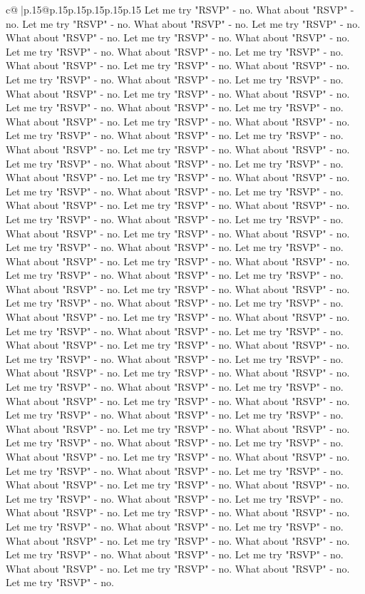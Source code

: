 \documentclass{article}
\begin{document}
{\begin{supertabular}{c@{$\;$}|p{.15\linewidth}@{}p{.15\linewidth}p{.15\linewidth}p{.15\linewidth}p{.15\linewidth}p{.15\linewidth}}
{{{Let me try "RSVP" {-} no. What about "RSVP" {-} no. Let me try "RSVP" {-} no. What about "RSVP" {-} no. Let me try "RSVP" {-} no. What about "RSVP" {-} no. Let me try "RSVP" {-} no. What about "RSVP" {-} no. Let me try "RSVP" {-} no. What about "RSVP" {-} no. Let me try "RSVP" {-} no. What about "RSVP" {-} no. Let me try "RSVP" {-} no. What about "RSVP" {-} no. Let me try "RSVP" {-} no. What about "RSVP" {-} no. Let me try "RSVP" {-} no. What about "RSVP" {-} no. Let me try "RSVP" {-} no. What about "RSVP" {-} no. Let me try "RSVP" {-} no. What about "RSVP" {-} no. Let me try "RSVP" {-} no. What about "RSVP" {-} no. Let me try "RSVP" {-} no. What about "RSVP" {-} no. Let me try "RSVP" {-} no. What about "RSVP" {-} no. Let me try "RSVP" {-} no. What about "RSVP" {-} no. Let me try "RSVP" {-} no. What about "RSVP" {-} no. Let me try "RSVP" {-} no. What about "RSVP" {-} no. Let me try "RSVP" {-} no. What about "RSVP" {-} no. Let me try "RSVP" {-} no. What about "RSVP" {-} no. Let me try "RSVP" {-} no. What about "RSVP" {-} no. Let me try "RSVP" {-} no. What about "RSVP" {-} no. Let me try "RSVP" {-} no. What about "RSVP" {-} no. Let me try "RSVP" {-} no. What about "RSVP" {-} no. Let me try "RSVP" {-} no. What about "RSVP" {-} no. Let me try "RSVP" {-} no. What about "RSVP" {-} no. Let me try "RSVP" {-} no. What about "RSVP" {-} no. Let me try "RSVP" {-} no. What about "RSVP" {-} no. Let me try "RSVP" {-} no. What about "RSVP" {-} no. Let me try "RSVP" {-} no. What about "RSVP" {-} no. Let me try "RSVP" {-} no. What about "RSVP" {-} no. Let me try "RSVP" {-} no. What about "RSVP" {-} no. Let me try "RSVP" {-} no. What about "RSVP" {-} no. Let me try "RSVP" {-} no. What about "RSVP" {-} no. Let me try "RSVP" {-} no. What about "RSVP" {-} no. Let me try "RSVP" {-} no. What about "RSVP" {-} no. Let me try "RSVP" {-} no. What about "RSVP" {-} no. Let me try "RSVP" {-} no. What about "RSVP" {-} no. Let me try "RSVP" {-} no. What about "RSVP" {-} no. Let me try "RSVP" {-} no. What about "RSVP" {-} no. Let me try "RSVP" {-} no. What about "RSVP" {-} no. Let me try "RSVP" {-} no. What about "RSVP" {-} no. Let me try "RSVP" {-} no. What about "RSVP" {-} no. Let me try "RSVP" {-} no. What about "RSVP" {-} no. Let me try "RSVP" {-} no. What about "RSVP" {-} no. Let me try "RSVP" {-} no. What about "RSVP" {-} no. Let me try "RSVP" {-} no. What about "RSVP" {-} no. Let me try "RSVP" {-} no. What about "RSVP" {-} no. Let me try "RSVP" {-} no. What about "RSVP" {-} no. Let me try "RSVP" {-} no. What about "RSVP" {-} no. Let me try "RSVP" {-} no. What about "RSVP" {-} no. Let me try "RSVP" {-} no. What about "RSVP" {-} no. Let me try "RSVP" {-} no. What about "RSVP" {-} no. Let me try "RSVP" {-} no. What about "RSVP" {-} no. Let me try "RSVP" {-} no. What about "RSVP" {-} no. Let me try "RSVP" {-} no. What about "RSVP" {-} no. Let me try "RSVP" {-} no. What about "RSVP" {-} no. Let me try "RSVP" {-} no. What about "RSVP" {-} no. Let me try "RSVP" {-} no. What about "RSVP" {-} no. Let me try "RSVP" {-} no. What about "RSVP" {-} no. Let me try "RSVP" {-} no. What about "RSVP" {-} no. Let me try "RSVP" {-} no. What about "RSVP" {-} no. Let me try "RSVP" {-} no. }}}
\end{supertabular}}
\end{document}
